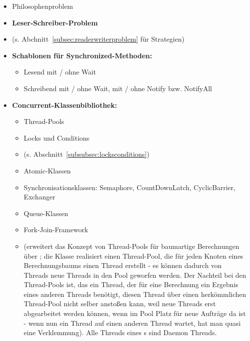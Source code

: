 \begin{itemize}
        \item Philosophenproblem

        \item \textbf{Leser-Schreiber-Problem}
        \item[] (s. Abchnitt~\ref{subsec:readerwriterproblem} für Strategien)

        \item \textbf{Schablonen für Synchronized-Methoden:}
        \begin{itemize}
            \item Lesend mit / ohne Wait
            \item Schreibend mit / ohne Wait, mit / ohne Notify bzw. NotifyAll
        \end{itemize}

        \item \textbf{Concurrent-Klassenbibliothek:}
        \begin{itemize}
            \item Thread-Pools
            \item Locks und Conditions
            \item[](s. Abschnitt~\ref{subsubsec:locksconditions})
            \item Atomic-Klassen
            \item Synchronisationsklassen: Semaphore, CountDownLatch, CyclicBarrier, Exchanger
            \item Queue-Klassen
            \item Fork-Join-Framework
            \item[] (erweitert das Konzept von Thread-Pools für baumartige Berechnungen über ; die Klasse realisiert einen Thread-Pool, die für jeden Knoten eines Berechnungsbaums einen Thread erstellt - es können dadurch von Threads neue Threads in den Pool geworfen werden. Der Nachteil bei den Thread-Pools ist, das ein Thread, der für eine Berechnung ein Ergebnis eines anderen Threads benötigt, diesen Thread über einen herkömmlichen Thread-Pool nicht selber anstoßen kann, weil neue Threads erst abgearbeitet werden können, wenn im Pool Platz für neue Aufträge da ist - wenn nun ein Thread auf einen anderen Thread wartet, hat man quasi eine Verklemmung).
            Alle Threads eines s sind Daemon Threads.
        \end{itemize}


\end{itemize}
